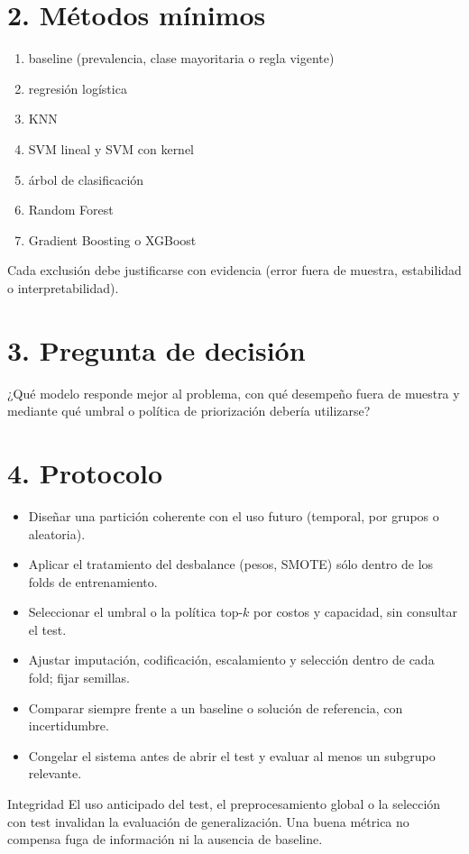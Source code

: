 \documentclass[11pt,letterpaper]{article}
\begin{document}
\section*{2. Métodos mínimos}
\begin{enumerate}
\item baseline (prevalencia, clase mayoritaria o regla vigente)
\item regresión logística
\item KNN
\item SVM lineal y SVM con kernel
\item árbol de clasificación
\item Random Forest
\item Gradient Boosting o XGBoost
\end{enumerate}
Cada exclusión debe justificarse con evidencia (error fuera de muestra, estabilidad o interpretabilidad).

\section*{3. Pregunta de decisión}
¿Qué modelo responde mejor al problema, con qué desempeño fuera de muestra y mediante qué umbral o
política de priorización debería utilizarse?

\section*{4. Protocolo}
\begin{itemize}
\item Diseñar una partición coherente con el uso futuro (temporal, por grupos o aleatoria).
\item Aplicar el tratamiento del desbalance (pesos, SMOTE) sólo dentro de los folds de entrenamiento.
\item Seleccionar el umbral o la política top-$k$ por costos y capacidad, sin consultar el test.
\item Ajustar imputación, codificación, escalamiento y selección dentro de cada fold; fijar semillas.
\item Comparar siempre frente a un baseline o solución de referencia, con incertidumbre.
\item Congelar el sistema antes de abrir el test y evaluar al menos un subgrupo relevante.
\end{itemize}
\begin{alertbox}{Integridad}
El uso anticipado del test, el preprocesamiento global o la selección con test invalidan la evaluación de generalización. Una buena métrica no compensa fuga de información ni la ausencia de baseline.
\end{alertbox}
\end{document}
